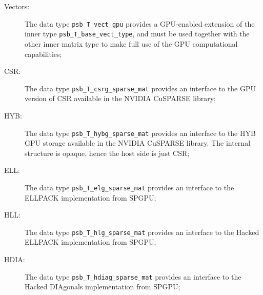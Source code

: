 \begin{description}
\item[Vectors:] The data type \verb|psb_T_vect_gpu| provides a
  GPU-enabled extension of the inner type \verb|psb_T_base_vect_type|,
  and must be used together with the other inner matrix type to make
  full use of the GPU computational capabilities;
\item[CSR:] The data type \verb|psb_T_csrg_sparse_mat| provides an
  interface to the GPU version of CSR available in the NVIDIA CuSPARSE
  library;
\item[HYB:] The data type \verb|psb_T_hybg_sparse_mat| provides an
  interface to the HYB GPU storage  available in the NVIDIA CuSPARSE
  library. The internal structure is opaque, hence the host side is
  just CSR;
\item[ELL:] The data type \verb|psb_T_elg_sparse_mat| provides an
  interface to the  ELLPACK implementation from SPGPU;

\item[HLL:] The data type \verb|psb_T_hlg_sparse_mat| provides an
  interface to the  Hacked ELLPACK implementation from SPGPU;
\item[HDIA:] The data type \verb|psb_T_hdiag_sparse_mat| provides an
  interface to the  Hacked DIAgonals implementation from SPGPU;
\end{description}


